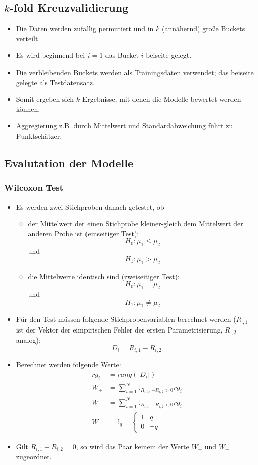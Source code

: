 \documentclass{scrartcl}
\begin{document}
\subsection{$ k $-fold Kreuzvalidierung}

\begin{itemize}
	\item Die Daten werden zufällig permutiert und in $ k $ (annähernd) große 
	Buckets verteilt.
	\item Es wird beginnend bei $ i=1 $ das Bucket $ i $ beiseite gelegt.
	\item Die verbleibenden Buckets werden als Trainingsdaten verwendet; das 
	beiseite gelegte als Testdatensatz.
	\item Somit ergeben sich $ k $ Ergebnisse, mit denen die Modelle bewertet 
	werden können.
	\item Aggregierung z.B. durch Mittelwert und Standardabweichung führt zu 
	Punktschätzer.
\end{itemize}

\subsection{Evalutation der Modelle}

\subsubsection{Wilcoxon Test}

\begin{itemize}
	\item Es werden zwei Stichproben danach getestet, ob
	\begin{itemize}
		\item der Mittelwert der einen Stichprobe kleiner-gleich dem Mittelwert 
		der anderen Probe ist (einseitiger Test):
		\[ H_0 : \mu_1 \leq \mu_2 \]
		und 
		\[ H_1 : \mu_1 > \mu_2 \]
		\item die Mittelwerte identisch sind (zweiseitiger Test):
		\[ H_0 : \mu_1 = \mu_2 \]
		und
		\[ H_1 : \mu_1 \neq \mu_2 \]
	\end{itemize}
	\item Für den Test müssen folgende Stichprobenvariablen berechnet werden ($ 
	R_{\cdot, 1} $ ist der Vektor der eimpirischen Fehler der ersten 
	Parametrisierung, $ R_{\cdot, 2} $ analog):
	\[ D_i = R_{i,1} - R_{i,2} \]
	\item Berechnet werden folgende Werte:
	\begin{align*}
		rg_i &= rang(|D_i|) \\
		W_+ &= \sum_{i=1}^{N} \mathbb{I}_{R_{i,1}, - R_{i,2} > 0} rg_i \\
		W_- &= \sum_{i=1}^{N} \mathbb{I}_{R_{i,1}, - R_{i,2} < 0} rg_i \\
		W &= \mathbb{I}_q = \begin{cases}
			1 & q \\
			0 & \neg q
		\end{cases}
	\end{align*}
	\item Gilt $ R_{i,1} - R_{i,2} = 0 $, so wird das Paar keinem der Werte $ 
	W_+ $ und $ W_- $ zugeordnet.
\end{itemize}
\end{document}
